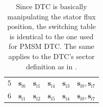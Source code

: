 \begin{frame}
\begin{table}[htbp]
\begin{tabular}{c c c c c c}
            5 & $\bm{s}_{\mathrm{i}6}$ & $\bm{s}_{\mathrm{i}1}$ & $\bm{s}_{\mathrm{i}4}$ & $\bm{s}_{\mathrm{i}3}$ & $\bm{s}_{\mathrm{i}0}, \bm{s}_{\mathrm{i}7}$ \\
            6 & $\bm{s}_{\mathrm{i}1}$ & $\bm{s}_{\mathrm{i}2}$ & $\bm{s}_{\mathrm{i}5}$ & $\bm{s}_{\mathrm{i}4}$ & $\bm{s}_{\mathrm{i}0}, \bm{s}_{\mathrm{i}7}$ \\
            \bottomrule
        \end{tabular}
        \caption{Since DTC is basically manipulating the stator flux position, the switching table is identical to the one used for PMSM DTC. The same applies to the DTC's sector definition as in .}
        \label{tab:DTC_switching_table_IM}
    \end{table}
\end{frame}


